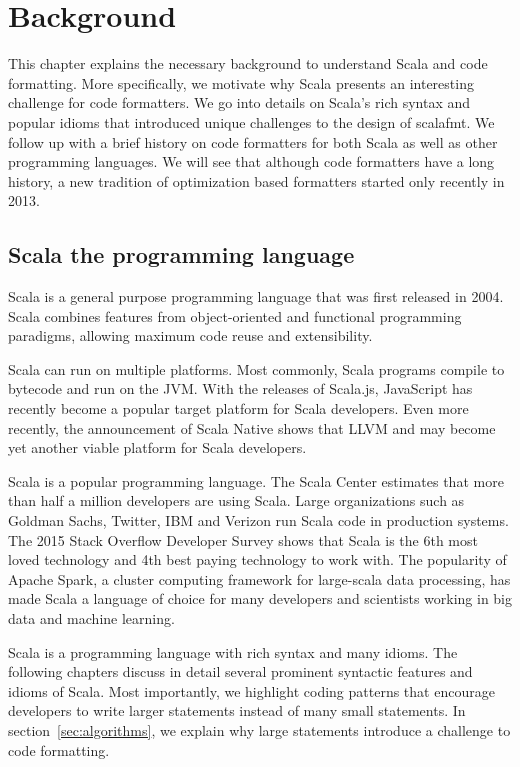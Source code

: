 \section{Background}
This chapter explains the necessary background to understand Scala and code formatting.
More specifically, we motivate why Scala presents an interesting challenge for code formatters.
We go into details on Scala's rich syntax and popular idioms that introduced unique challenges to the design of scalafmt.
We follow up with a brief history on code formatters for both Scala as well as other programming languages.
We will see that although code formatters have a long history, a new tradition of optimization based formatters started only recently in 2013.

\subsection{Scala the programming language}
Scala\autocite{odersky_scala_2004} is a general purpose programming language that was first released in 2004.
Scala combines features from object-oriented and functional programming paradigms, allowing maximum code reuse and extensibility.

Scala can run on multiple platforms.
Most commonly, Scala programs compile to bytecode and run on the JVM.
With the releases of Scala.js\autocite{doeraene_scala.js_2015}, JavaScript has recently become a popular target platform for Scala developers.
Even more recently, the announcement of Scala Native\autocite{_scala-native/scala-native_????} shows that LLVM and may become yet another viable platform for Scala developers.

Scala is a popular programming language.
The Scala Center estimates that more than half a million developers are using Scala\autocite{odersky_scala_2016}.
Large organizations such as Goldman Sachs, Twitter, IBM and Verizon run Scala code in production systems.
The 2015 Stack Overflow Developer Survey shows that Scala is the 6th most loved technology and 4th best paying technology to work with\autocite{_stack_????}.
The popularity of Apache Spark\autocite{_apache_????-1}, a cluster computing framework for large-scala data processing, has made Scala a language of choice for many developers and scientists working in big data and machine learning.

Scala is a programming language with rich syntax and many idioms.
The following chapters discuss in detail several prominent syntactic features and idioms of Scala.
Most importantly, we highlight coding patterns that encourage developers to write larger statements instead of many small statements.
In section~\ref{sec:algorithms}, we explain why large statements introduce a challenge to code formatting.

